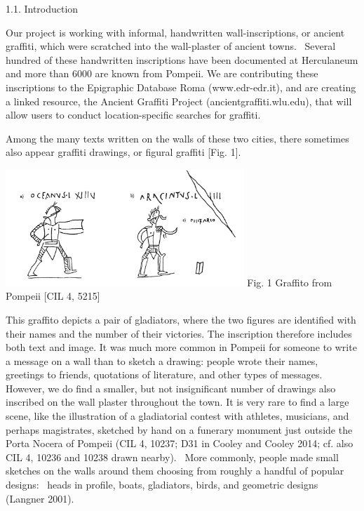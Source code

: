 \documentclass[amsthm,ebook]{saparticle}
\title{}
\author{Rebecca Benefiel}
\date{2015-11-19}
\begin{document}
1.1. Introduction

Our project is working with informal, handwritten wall-inscriptions, or ancient graffiti, which were scratched into the
wall-plaster of ancient towns. \ Several hundred of these handwritten inscriptions have been documented at Herculaneum
and more than 6000 are known from Pompeii. We are contributing these inscriptions to the Epigraphic Database Roma
(www.edr-edr.it), and are creating a linked resource, the Ancient Graffiti Project (ancientgraffiti.wlu.edu), that will
allow users to conduct location-specific searches for graffiti. 

Among the many texts written on the walls of these two cities, there sometimes also appear graffiti drawings, or figural
graffiti [Fig. 1]. 

 \includegraphics[width=8.985cm,height=4.413cm]{EAGLE2016BenefielSypniewski-img001.jpg} \newline
Fig. 1 Graffito from Pompeii [CIL 4, 5215]\newline


This graffito depicts a pair of gladiators, where the two figures are identified with their names and the number of
their victories. The inscription therefore includes both text and image. It was much more common in Pompeii for someone
to write a message on a wall than to sketch a drawing: people wrote their names, greetings to friends, quotations of
literature, and other types of messages. However, we do find a smaller, but not insignificant number of drawings also
inscribed on the wall plaster throughout the town. It is very rare to find a large scene, like the illustration of a
gladiatorial contest with athletes, musicians, and perhaps magistrates, sketched by hand on a funerary monument just
outside the Porta Nocera of Pompeii (CIL 4, 10237; D31 in Cooley and Cooley 2014; cf. also CIL 4, 10236 and 10238 drawn
nearby). \ More commonly, people made small sketches on the walls around them choosing from roughly a handful of
popular designs: \ heads in profile, boats, gladiators, birds, and geometric designs (Langner 2001).
\end{document}
